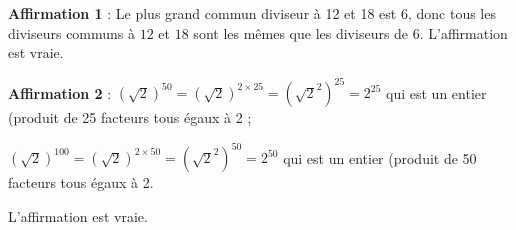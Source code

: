 
\medskip 


 
\textbf{Affirmation 1} : %
Le plus grand commun diviseur à 12 et 18 est 6, donc tous les diviseurs communs à $12$ et $18$ sont les mêmes que les diviseurs de $6$. L'affirmation est vraie. 

\textbf{Affirmation 2} : %
$\left(\sqrt{2}\right)^{50} = \left(\sqrt{2}\right)^{2 \times 25} = \left(\sqrt{2}^2\right)^{25} = 2^{25}$ qui est un entier (produit de 25 facteurs tous égaux à 2 ;

$\left(\sqrt{2}\right)^{100} = \left(\sqrt{2}\right)^{2 \times 50} = \left(\sqrt{2}^2\right)^{50} = 2^{50}$ qui est un entier (produit de 50 facteurs tous égaux à 2.

L'affirmation est vraie.
 

